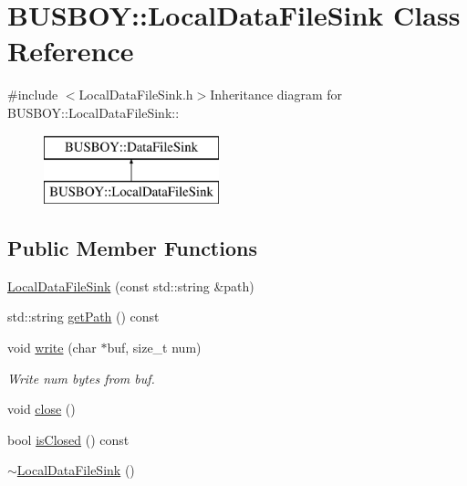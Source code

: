 \hypertarget{classBUSBOY_1_1LocalDataFileSink}{
\section{BUSBOY::LocalDataFileSink Class Reference}
\label{classBUSBOY_1_1LocalDataFileSink}
}


{\ttfamily \#include $<$LocalDataFileSink.h$>$}Inheritance diagram for BUSBOY::LocalDataFileSink::\begin{figure}[H]
\begin{center}
\leavevmode
\includegraphics[height=2cm]{classBUSBOY_1_1LocalDataFileSink}
\end{center}
\end{figure}
\subsection*{Public Member Functions}
\begin{DoxyCompactItemize}
\item 
\hyperlink{classBUSBOY_1_1LocalDataFileSink_a1e7cdb2aab1e054cd3742f11654056a2}{LocalDataFileSink} (const std::string \&path)
\item 
std::string \hyperlink{classBUSBOY_1_1LocalDataFileSink_a7b446b6a66e768ed819b6fc71e93c934}{getPath} () const 
\item 
void \hyperlink{classBUSBOY_1_1LocalDataFileSink_a97aee92204860bb3f433f8b1520fd93b}{write} (char $\ast$buf, size\_\-t num)
\begin{DoxyCompactList}\small\item\em Write num bytes from buf. \item\end{DoxyCompactList}\item 
void \hyperlink{classBUSBOY_1_1LocalDataFileSink_a4f02e74ccc66d094135957cd1761457e}{close} ()
\item 
bool \hyperlink{classBUSBOY_1_1LocalDataFileSink_aaf46e7aa06db39f9a702cae3054c58e3}{isClosed} () const 
\item 
\hyperlink{classBUSBOY_1_1LocalDataFileSink_a1669f187a1735c543222347c90527fca}{$\sim$LocalDataFileSink} ()
\end{DoxyCompactItemize}


